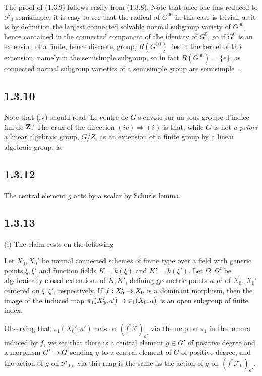 \documentclass[deligne.tex]{subfiles}
\begin{document}
The proof of (1.3.9) follows easily from (1.3.8). Note that once one has
reduced to $\mathscr F_0$ semisimple, it is easy to see that the radical of
$G^{00}$ in this case is trivial, as it is by definition the largest
connected solvable normal subgroup variety of $G^{00}$, hence contained in
the connected component of the identity of $G^0$, so if $G^0$ is an
extension of a finite, hence discrete, group, $R(G^{00})$ lies in the
kernel of this extension, namely in the semisimple subgroup, so in fact
$R(G^{00})=\{e\}$, as connected normal subgroup varieties of a semisimple
group are semisimple~\cite[21.52]{Milne}.

\subsection*{1.3.10} Note that (iv) should read 'Le centre de $G$ s'envoie sur
un sous-groupe d'indice fini de $\mathbf{Z}$.' The crux of the direction
$(iv)\Rightarrow(i)$ is that, while $G$ is not \textit{a priori} a linear
algebraic group, $G/Z$, as an extension of a finite group by a linear
algebraic group, is.

\subsection*{1.3.12} The central element $g$ acts by a scalar by Schur's lemma.

\subsection*{1.3.13} (i) The claim rests on the following
\begin{lemma*} Let $X_0,X_0'$ be normal connected schemes of finite type
over a field with generic points $\xi,\xi'$ and function fields $K=k(\xi)$ 
and $K'=k(\xi')$. Let $\Omega,\Omega'$ be algebraically closed extensions of 
$K,K'$, defining geometric points $a,a'$ of $X_0$, $X_0'$ centered on
$\xi,\xi'$, respectively.
If $f:X_0'\rightarrow X_0$ is a dominant morphism, then the image of the induced map 
$\pi_1(X_0',a')\rightarrow\pi_1(X_0,a)$ is an open subgroup of finite index.
\end{lemma*}
Observing that $\pi_1(X_0',a')$ acts on
$(f^\ast\mathscr F)_{a'}$ via the map on $\pi_1$ in the lemma induced by 
$f$, we see that there is a central element $g\in G'$ of positive degree and 
a morphism $G'\rightarrow G$ sending $g$ to a central element of $G$ of positive
degree, and the action of $g$ on $\mathscr F_{0,a}$ via this map is the 
same as the action of $g$ on $(f^\ast\mathscr F_0)_{a'}$.
\end{document}
